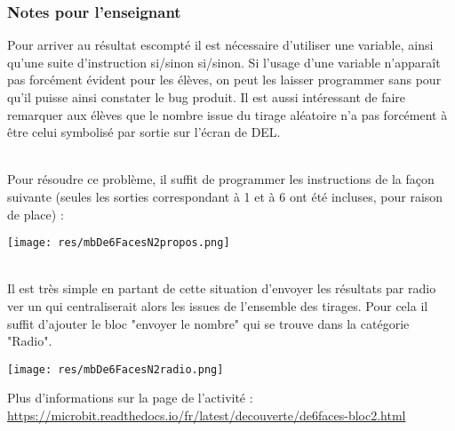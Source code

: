 \newpage
\subsubsection{Notes pour l'enseignant}

Pour arriver au résultat escompté il est nécessaire d'utiliser une variable, ainsi qu'une suite d'instruction si/sinon si/sinon. Si l'usage d'une variable n'apparaît pas forcément évident pour les élèves, on peut les laisser programmer sans pour qu'il puisse ainsi constater le bug produit.
Il est aussi intéressant de faire remarquer aux élèves que le nombre issue du tirage aléatoire n'a pas forcément à être celui symbolisé par sortie sur l'écran de DEL.


\begin{minipage}[t]{0.5\linewidth}
    \begin{methode}~\\
    Pour résoudre ce problème, il suffit de programmer les instructions de la façon suivante (seules les sorties correspondant à 1 et à 6 ont été incluses, pour raison de place) :
    
    \texttt{[image: res/mbDe6FacesN2propos.png]}
    \end{methode}
\end{minipage}
\hfill
\begin{minipage}[t]{0.5\linewidth}
    \begin{remarque}~\\
    Il est très simple en partant de cette situation d'envoyer les résultats par radio ver un \mb qui centraliserait alors les issues de l'ensemble des tirages. Pour cela il suffit d'ajouter le bloc "envoyer le nombre" qui se trouve dans la catégorie "Radio".
    
    \texttt{[image: res/mbDe6FacesN2radio.png]}
    
    Plus d'informations sur la page de l'activité :\\ \url{https://microbit.readthedocs.io/fr/latest/decouverte/de6faces-bloc2.html}
    \end{remarque}
\end{minipage}